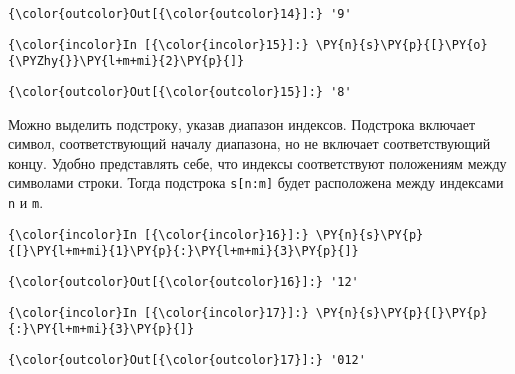             \begin{Verbatim}[commandchars=\\\{\}]
{\color{outcolor}Out[{\color{outcolor}14}]:} '9'
\end{Verbatim}
        
    \begin{Verbatim}[commandchars=\\\{\}]
{\color{incolor}In [{\color{incolor}15}]:} \PY{n}{s}\PY{p}{[}\PY{o}{\PYZhy{}}\PY{l+m+mi}{2}\PY{p}{]}
\end{Verbatim}

            \begin{Verbatim}[commandchars=\\\{\}]
{\color{outcolor}Out[{\color{outcolor}15}]:} '8'
\end{Verbatim}
        
    Можно выделить подстроку, указав диапазон индексов. Подстрока включает
символ, соответствующий началу диапазона, но не включает соответствующий
концу. Удобно представлять себе, что индексы соответствуют положениям
между символами строки. Тогда подстрока \texttt{s{[}n:m{]}} будет
расположена между индексами \texttt{n} и \texttt{m}.

    \begin{center}
    \end{center}

    \begin{Verbatim}[commandchars=\\\{\}]
{\color{incolor}In [{\color{incolor}16}]:} \PY{n}{s}\PY{p}{[}\PY{l+m+mi}{1}\PY{p}{:}\PY{l+m+mi}{3}\PY{p}{]}
\end{Verbatim}

            \begin{Verbatim}[commandchars=\\\{\}]
{\color{outcolor}Out[{\color{outcolor}16}]:} '12'
\end{Verbatim}
        
    \begin{Verbatim}[commandchars=\\\{\}]
{\color{incolor}In [{\color{incolor}17}]:} \PY{n}{s}\PY{p}{[}\PY{p}{:}\PY{l+m+mi}{3}\PY{p}{]}
\end{Verbatim}

            \begin{Verbatim}[commandchars=\\\{\}]
{\color{outcolor}Out[{\color{outcolor}17}]:} '012'
\end{Verbatim}
        
